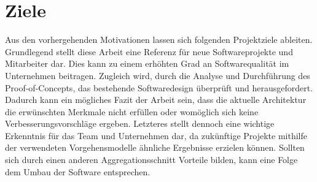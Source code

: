 \section{Ziele}


Aus den vorhergehenden Motivationen lassen sich folgenden Projektziele ableiten. Grundlegend stellt diese Arbeit eine Referenz für neue Softwareprojekte und Mitarbeiter dar. Dies kann zu einem erhöhten Grad an Softwarequalität im Unternehmen beitragen. Zugleich wird, durch die Analyse und Durchführung des Proof-of-Concepts, das bestehende Softwaredesign überprüft und herausgefordert. Dadurch kann ein mögliches Fazit der Arbeit sein, dass die aktuelle Architektur die erwünschten Merkmale nicht erfüllen oder womöglich sich keine Verbesserungsvorschläge ergeben. Letzteres stellt dennoch eine wichtige Erkenntnis für das Team und Unternehmen dar, da zukünftige Projekte mithilfe der verwendeten Vorgehensmodelle ähnliche Ergebnisse erzielen können. Sollten sich durch einen anderen Aggregationsschnitt Vorteile bilden, kann eine Folge dem Umbau der Software entsprechen.
